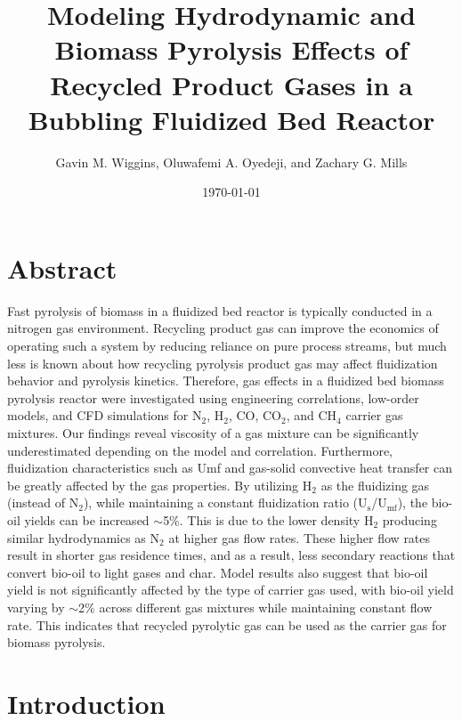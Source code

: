 \documentclass{article}
\title{Modeling Hydrodynamic and Biomass Pyrolysis Effects of Recycled Product Gases in a Bubbling Fluidized Bed Reactor}
\author{Gavin M. Wiggins, Oluwafemi A. Oyedeji, and Zachary G. Mills}
\date{\today}
\begin{document}
\maketitle


\section*{Abstract}

Fast pyrolysis of biomass in a fluidized bed reactor is typically conducted in a nitrogen gas environment. Recycling product gas can improve the economics of operating such a system by reducing reliance on pure process streams, but much less is known about how recycling pyrolysis product gas may affect fluidization behavior and pyrolysis kinetics. Therefore, gas effects in a fluidized bed biomass pyrolysis reactor were investigated using engineering correlations, low-order models, and CFD simulations for N$_2$, H$_2$, CO, CO$_2$, and CH$_4$ carrier gas mixtures. Our findings reveal viscosity of a gas mixture can be significantly underestimated depending on the model and correlation. Furthermore, fluidization characteristics such as Umf and gas-solid convective heat transfer can be greatly affected by the gas properties. By utilizing H$_2$ as the fluidizing gas (instead of N$_2$), while maintaining a constant fluidization ratio (U$_\text{s}$/U$_\text{mf}$), the bio-oil yields can be increased $\sim$5\%. This is due to the lower density H$_2$ producing similar hydrodynamics as N$_2$ at higher gas flow rates. These higher flow rates result in shorter gas residence times, and as a result, less secondary reactions that convert bio-oil to light gases and char. Model results also suggest that bio-oil yield is not significantly affected by the type of carrier gas used, with bio-oil yield varying by $\sim$2\% across different gas mixtures while maintaining constant flow rate. This indicates that recycled pyrolytic gas can be used as the carrier gas for biomass pyrolysis.


\section{Introduction}
\end{document}
